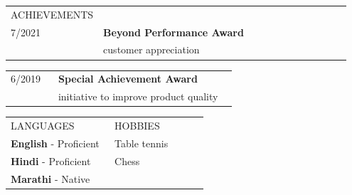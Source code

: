 \documentclass{letter}
\begin{document}
\vspace{15pt}
\begin{tabular}{p{0.2\linewidth} p{0.75\linewidth}}
  \normalsize\colorbox{black!100}{\textcolor{white!90}{ACHIEVEMENTS}} \\[1ex] 
  7/2021 & \normalsize\textbf{Beyond Performance Award}\\
  & \small customer appreciation \\
\end{tabular}

\begin{tabular}{p{0.2\linewidth} p{0.75\linewidth}}
  6/2019 & \normalsize\textbf{Special Achievement Award} \\
  & \small initiative to improve product quality \\
\end{tabular}

%
\vspace{15pt}
\begin{tabular}{p{0.5\linewidth} p{0.45\linewidth}}
  \normalsize\colorbox{black!100}{\textcolor{white!90}{LANGUAGES}} & 
  \normalsize\colorbox{black!100}{\textcolor{white!90}{HOBBIES}} \\[1ex] 

  \textbf{English} - Proficient & Table tennis \\
  \textbf{Hindi} - Proficient & Chess \\ 
  \textbf{Marathi} - Native \\
\end{tabular}
\end{document}
